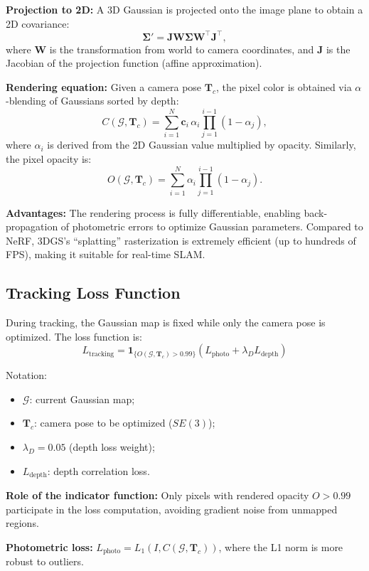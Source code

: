 \documentclass[12pt,a4paper,onecolumn]{article}
\begin{document}
\textbf{Projection to 2D:} A 3D Gaussian is projected onto the image plane to obtain a 2D covariance:
\[
\boldsymbol{\Sigma}' = \mathbf{J} \mathbf{W} \boldsymbol{\Sigma} \mathbf{W}^\top \mathbf{J}^\top,
\]
where $\mathbf{W}$ is the transformation from world to camera coordinates, and $\mathbf{J}$ is the Jacobian of the projection function (affine approximation).

\textbf{Rendering equation:} Given a camera pose $\mathbf{T}_c$, the pixel color is obtained via $\alpha$-blending of Gaussians sorted by depth:
\[
C(\mathcal{G}, \mathbf{T}_c) = \sum_{i=1}^{N} \mathbf{c}_i \, \alpha_i \prod_{j=1}^{i-1} (1 - \alpha_j),
\]
where $\alpha_i$ is derived from the 2D Gaussian value multiplied by opacity. Similarly, the pixel opacity is:
\[
O(\mathcal{G}, \mathbf{T}_c) = \sum_{i=1}^{N} \alpha_i \prod_{j=1}^{i-1} (1 - \alpha_j).
\]

\textbf{Advantages:} The rendering process is fully differentiable, enabling back-propagation of photometric errors to optimize Gaussian parameters. Compared to NeRF, 3DGS's ``splatting'' rasterization is extremely efficient (up to hundreds of FPS), making it suitable for real-time SLAM.

\subsection{Tracking Loss Function}

During tracking, the Gaussian map is fixed while only the camera pose is optimized. The loss function is:
\[
L_{\text{tracking}} = \mathbf{1}_{\{O(\mathcal{G}, \mathbf{T}_c) > 0.99\}} \left( L_{\text{photo}} + \lambda_D L_{\text{depth}} \right)
\]

Notation:
\begin{itemize}
    \item $\mathcal{G}$: current Gaussian map;
    \item $\mathbf{T}_c$: camera pose to be optimized ($SE(3)$);
    \item $\lambda_D = 0.05$ (depth loss weight);
    \item $L_{\text{depth}}$: depth correlation loss.
\end{itemize}

\textbf{Role of the indicator function:} Only pixels with rendered opacity $O>0.99$ participate in the loss computation, avoiding gradient noise from unmapped regions.

\textbf{Photometric loss:} $L_{\text{photo}} = L_1(I, C(\mathcal{G}, \mathbf{T}_c))$, where the L1 norm is more robust to outliers.
\end{document}
